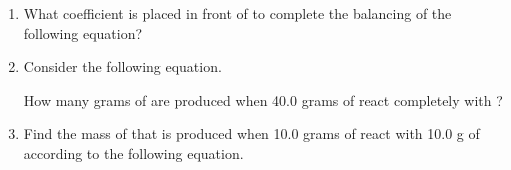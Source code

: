 \documentclass[main.tex]{subfiles}
\begin{document}
\begin{fullwidth}
\begin{multicols*}{2}
\begin{enumerate}
\item  What coefficient is placed in front of  to complete the balancing of the following equation?
\begin{center}	\end{center}
 \begin{enumerate}[label=(\alph*)]\vspace{-0.5cm}
\end{enumerate}\vspace{-0.5cm}

\item  Consider the following equation. 
\begin{center}\end{center}	
How many grams of  are produced when 40.0 grams of  react completely with ?
 \begin{enumerate}[label=(\alph*)]\vspace{-0.5cm}
\end{enumerate}\vspace{-0.5cm}

\item  Find the mass of  that is produced when 10.0 grams of  react with 10.0 g of  according to the following equation.
\begin{center}\end{center}
 \begin{enumerate}[label=(\alph*)]\vspace{-0.5cm}
\end{enumerate}\vspace{-0.5cm}


\end{enumerate}
\end{multicols*}
\end{fullwidth}
\end{document}

